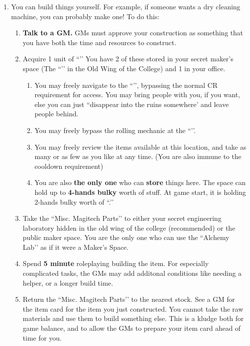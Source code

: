 \documentclass[green]{GL2020}
\begin{document}
\begin{enumerate}
  \item You can build things yourself. For example, if someone wants a dry cleaning machine, you can probably make one! To do this:
  \begin{enumerate}
    \item \textbf{Talk to a GM.} GMs must approve your construction as something that you have both the time and resources to construct.
    \item Acquire 1 unit of ``\iMagitechParts{}’’ You have 2 of these stored in your secret maker’s space (The ``\sAlchemyLabOne’’ in the Old Wing of the College) and 1 in your office.
  \begin{enumerate}
    \item You may freely navigate to the ``\sAlchemyLabOne’’, bypassing the normal CR requirement for access. You may bring people with you, if you want, else you can just ``disappear into the ruins somewhere' and leave people behind.
    \item You may freely bypass the rolling mechanic at  the ``\sAlchemyLabOne’’.
    \item You may freely review the items available at this location, and take as many or as few as you like at any time. (You are also immune to the cooldown requirement)
    \item You are also \textbf{the only one} who can \textbf{store} things here. The space can hold up to \textbf{4-hands bulky} worth of stuff. At game start, it is holding 2-hands bulky worth of ``\iMagitechParts{}.’’
  \end{enumerate}
  \item Take the ``Misc. Magitech Parts’’ to either your secret engineering laboratory hidden in the old wing of the college (recommended) or the public maker space. You are the only one who can use the ``Alchemy Lab’’ as if it were a Maker’s Space.
  \item Spend \textbf{5 minute} roleplaying building the item. For especially complicated tasks, the GMs may add additonal conditions like needing a helper, or a longer build time.
  \item Return the ``Misc. Magitech Parts’’ to the nearest stock. See a GM for the item card for the item you just constructed. You cannot take the raw materials and use them to build something else. This is a kludge both for game balance, and to allow the GMs to prepare your item card ahead of time for you.
  \end{enumerate}
\end{enumerate}
\end{document}
